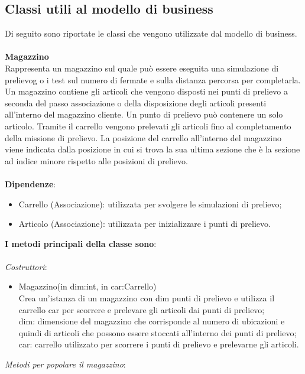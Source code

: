 \subsection{Classi utili al modello di business} %
Di seguito sono riportate le classi che vengono utilizzate dal modello di business.
\\\\
\textbf{Magazzino}
\\
Rappresenta un magazzino sul quale può essere eseguita una \gls{simulazione di prelievog} o i
test sul numero di fermate e sulla distanza percorsa per completarla.
Un magazzino contiene gli articoli che vengono disposti nei punti di prelievo a seconda del passo associazione o della disposizione degli articoli presenti all'interno del magazzino cliente.
Un punto di prelievo può contenere un solo articolo.
Tramite il carrello vengono prelevati gli articoli fino al completamento della missione di prelievo.
La posizione del carrello all'interno del magazzino viene indicata dalla posizione in cui si trova la sua ultima sezione che è la sezione ad indice minore rispetto alle posizioni di prelievo.\\\\
\textbf{Dipendenze}:
\begin{itemize}
    \item Carrello (Associazione): utilizzata per svolgere le simulazioni di prelievo;
    \item Articolo (Associazione): utilizzata per inizializzare i punti di prelievo.\\
\end{itemize}
\textbf{I metodi principali della classe sono}:
\\\\
\textit{Costruttori}:
\begin{itemize}
    \item Magazzino(in dim:int, in car:Carrello)\\
    Crea un'istanza di un magazzino con dim punti di prelievo e utilizza il carrello car per scorrere e prelevare gli articoli dai punti di prelievo;\\
    dim: dimensione del magazzino che corrisponde al numero di ubicazioni e quindi di articoli che possono essere stoccati all'interno dei punti di prelievo;\\
    car: carrello utilizzato per scorrere i punti di prelievo e prelevarne gli articoli.\\
\end{itemize}
\textit{Metodi per popolare il magazzino}:
